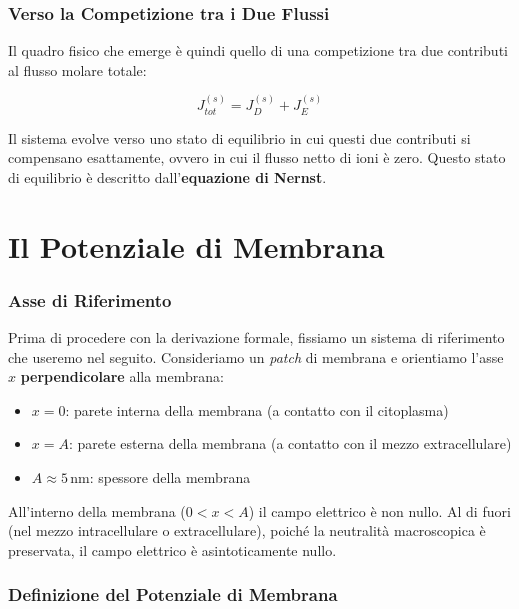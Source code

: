 \subsubsection{Verso la Competizione tra i Due Flussi}

Il quadro fisico che emerge è quindi quello di una competizione tra due contributi al flusso molare totale:

\begin{equation}
J_{tot}^{(s)} = J_D^{(s)} + J_E^{(s)}
\end{equation}

Il sistema evolve verso uno stato di equilibrio in cui questi due contributi si compensano esattamente, ovvero in cui il flusso netto di ioni è zero. Questo stato di equilibrio è descritto dall'\textbf{equazione di Nernst}.


\section{Il Potenziale di Membrana}

\subsubsection{Asse di Riferimento}

Prima di procedere con la derivazione formale, fissiamo un sistema di riferimento che useremo nel seguito. Consideriamo un \textit{patch} di membrana e orientiamo l'asse $x$ \textbf{perpendicolare} alla membrana:

\begin{itemize}
    \item $x = 0$: parete interna della membrana (a contatto con il citoplasma)
    \item $x = A$: parete esterna della membrana (a contatto con il mezzo extracellulare)
    \item $A \approx 5\,\text{nm}$: spessore della membrana
\end{itemize}

All'interno della membrana ($0 < x < A$) il campo elettrico è non nullo. Al di fuori (nel mezzo intracellulare o extracellulare), poiché la neutralità macroscopica è preservata, il campo elettrico è asintoticamente nullo.

\subsubsection{Definizione del Potenziale di Membrana}

